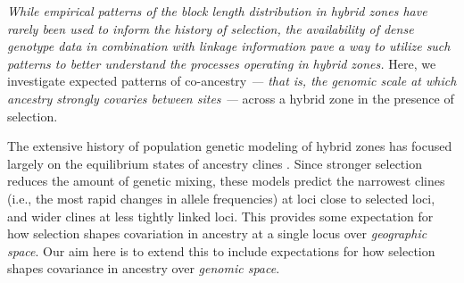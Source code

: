 \documentclass[11pt,letterpaper]{article}
\newcommand{\alisa}[1]{{\em \color{red} #1}}
\newcommand{\yb}[1]{{\em \color{magenta} #1}}
\begin{document}
\yb{While empirical patterns of the block length distribution in hybrid zones have rarely been used to inform the history of selection,}  \alisa{the availability of dense genotype data in combination with linkage information pave a way to utilize such patterns to better understand the processes operating in hybrid zones. } %
Here, we investigate expected patterns of co-ancestry \yb{ --- that is, the genomic scale at which ancestry strongly covaries between sites --- } across a hybrid zone in the presence of selection. 


The extensive history of population genetic modeling of hybrid zones has focused largely on the equilibrium states of ancestry clines \citep{Barton1979a,Barton1986}.  
Since stronger selection reduces the amount of genetic mixing,
these models predict the narrowest clines 
(i.e., the most rapid changes in allele frequencies)
at loci close to selected loci, and wider clines at less tightly linked loci.
This provides some expectation for how selection shapes covariation in ancestry at a single locus over \emph{geographic space}.
Our aim here is to extend this to include expectations for how selection shapes covariance in ancestry over \emph{genomic space}.
\end{document}
